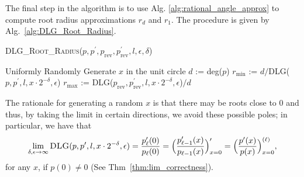 \documentclass[runningheads]{llncs}
\begin{document}
The final step in the algorithm is to use Alg. \ref{alg:rational_angle_approx} to compute root radius approximations $r_d$ and $r_1$.
The procedure is given by Alg.~\ref{alg:DLG_Root_Radius}.
\begin{algorithm}
\caption{\textsc{DLG\_Root\_Radius}($p,p^\prime,p_\mathrm{rev},p^\prime_\mathrm{rev},l, \epsilon, \delta $)}
\label{alg:DLG_Root_Radius}
\begin{algorithmic}
\STATE Uniformly Randomly Generate $x $ in the unit circle
\STATE $d$ := deg($p$)
\STATE $r_\mathrm{min} $ := $d/$\textsc{DLG}($p,p^\prime ,l,x\cdot 2^{-\delta}, \epsilon $)
\STATE $r_\mathrm{max} $ := \textsc{DLG}($p_\mathrm{rev},p^\prime _\mathrm{rev},l,x\cdot 2^{-\delta}, \epsilon$)$/d$
\end{algorithmic}
\end{algorithm}
The rationale for generating a random $x$ is that there may be roots close to 0 and thus, by taking the limit in certain directions, we avoid these possible poles; in particular, we have that
\begin{equation}\label{eq:lim_DLG}
  \lim_{ \delta,\epsilon \to \infty }  \textsc{DLG}(p,p^\prime ,l,x\cdot 2^{-\delta}, \epsilon ) = \frac{p_{{\ell}}'(0)}{p_{\ell}(0)}=\Big(\frac{p_{\ell-1}'(x)}{p_{\ell-1}(x)}\Big)_{x=0}'=\Big(\frac{p'(x)}{p(x)}\Big)_{x=0}^{(\ell)},
\end{equation}
for any $x$, if $p(0) \neq 0$ (See Thm~\ref{thm:lim_correctness}).

\end{document}
